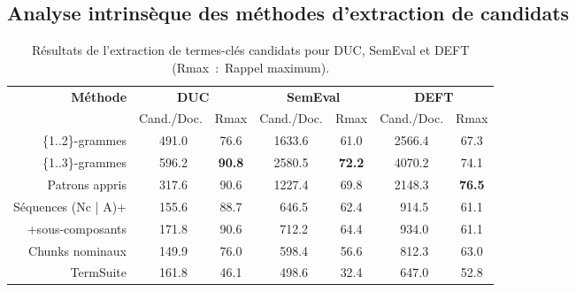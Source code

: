   \subsection{Analyse intrinsèque des méthodes d'extraction de candidats}
  \label{subsec:analyse_intrinseque_des_methodes_d_extraction_de_candidats}
    \begin{table}
      \centering
      \begin{tabular}{@{~}r@{~~}c@{~~}cc@{~~}cc@{~~}c@{~}}
        \toprule
        \multirow{2}{*}[-2pt]{\textbf{Méthode}} & \multicolumn{2}{c}{\textbf{DUC}} & \multicolumn{2}{c}{\textbf{SemEval}} & \multicolumn{2}{c}{\textbf{DEFT}}\\
        \cmidrule(r){2-3}\cmidrule(lr){4-5}\cmidrule(l){6-7}
        & Cand./Doc. & Rmax & Cand./Doc. & Rmax & Cand./Doc. & Rmax\\
        \midrule
        \{1..2\}-grammes & $~~$491.0 & 76.6 & 1633.6 & 61.0 & 2566.4 & 67.3\\
        \{1..3\}-grammes & $~~$596.2 & \textbf{90.8} & 2580.5 & \textbf{72.2} & 4070.2 & 74.1\\
        Patrons appris & $~~$317.6 & 90.6 & 1227.4 & 69.8 & 2148.3 & \textbf{76.5}\\
        Séquences (Nc | A)+ & $~~$155.6 & 88.7 & $~~$646.5 & 62.4 & $~~$914.5 & 61.1\\
        +sous-composants & $~~$171.8 & 90.6 & $~~$712.2 & 64.4 & $~~$934.0 & 61.1\\
        Chunks nominaux & $~~$149.9 & 76.0 & $~~$598.4 & 56.6 & $~~$812.3 & 63.0\\
        TermSuite & $~~$161.8 & 46.1 & $~~$498.6 & 32.4 & $~~$647.0 & 52.8\\
        \bottomrule
      \end{tabular}
      \caption{Résultats de l'extraction de termes-clés candidats pour DUC,
               SemEval et DEFT (Rmax~:~Rappel maximum).
               \label{tab:resultats_de_l_extraction_de_candidats}}
    \end{table}

